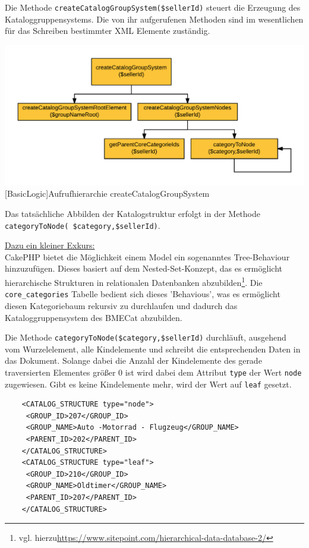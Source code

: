 	Die Methode \texttt{createCatalogGroupSystem(\$sellerId)} steuert die Erzeugung des Kataloggruppensystems. Die von ihr aufgerufenen Methoden sind im wesentlichen für das Schreiben bestimmter XML Elemente zuständig.\\
	\begin{minipage}{\linewidth}
		\vspace{1em}
		\centering
		\includegraphics[width=0.7 \linewidth]{img/CreateCatalogGroupSystemHierarchie}
		[BasicLogic]{Aufrufhierarchie createCatalogGroupSystem}
		\vspace{1em}
	\end{minipage}
	
	 Das tatsächliche Abbilden der Katalogstruktur erfolgt in der Methode \texttt{categoryToNode(\ \$category,\$sellerId)}.
	 
	\begin{addmargin}[1cm]{1cm}
	\underline{Dazu ein kleiner Exkurs:}\\
		 CakePHP bietet die Möglichkeit einem Model ein sogenanntes Tree-Behaviour hinzuzufügen. Dieses basiert auf dem Nested-Set-Konzept, das es ermöglicht hierarchische Strukturen in relationalen Datenbanken abzubilden\footnote{vgl. hierzu\url{https://www.sitepoint.com/hierarchical-data-database-2/}}. Die \texttt{core\_categories} Tabelle bedient sich dieses 'Behavious', was es ermöglicht diesen Kategoriebaum rekursiv zu durchlaufen und dadurch das Kataloggruppensystem des BMECat abzubilden.
	\end{addmargin}
	
	
	Die Methode \texttt{categoryToNode(\$category,\$sellerId)} durchläuft, ausgehend vom Wurzelelement, alle Kindelemente und schreibt die entsprechenden Daten in das Dokument. Solange dabei die Anzahl der Kindelemente des gerade traversierten Elementes größer 0 ist wird dabei dem Attribut \texttt{type} der Wert \texttt{node} zugewiesen. Gibt es keine Kindelemente mehr, wird der Wert auf \texttt{leaf} gesetzt. 
	\lstset{language=xml}
	\begin{lstlisting}
	<CATALOG_STRUCTURE type="node">
	 <GROUP_ID>207</GROUP_ID>
	 <GROUP_NAME>Auto -Motorrad - Flugzeug</GROUP_NAME>
	 <PARENT_ID>202</PARENT_ID>
	</CATALOG_STRUCTURE>
	<CATALOG_STRUCTURE type="leaf">
	 <GROUP_ID>210</GROUP_ID>
	 <GROUP_NAME>Oldtimer</GROUP_NAME>
	 <PARENT_ID>207</PARENT_ID>
	</CATALOG_STRUCTURE>
	\end{lstlisting}
	

